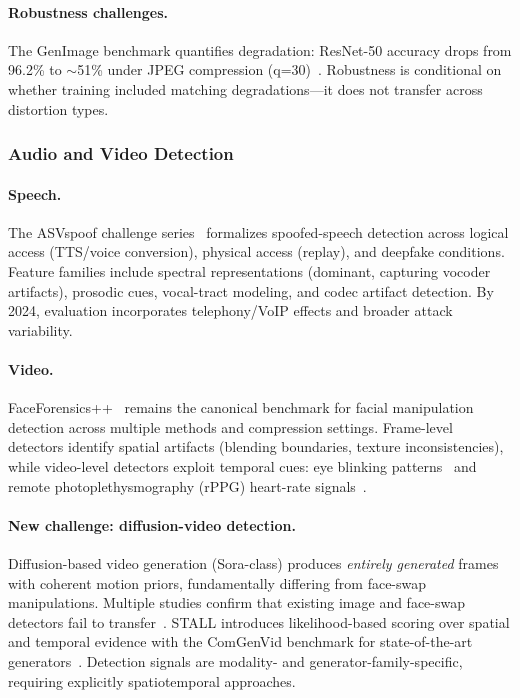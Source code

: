 \paragraph{Robustness challenges.}
The GenImage benchmark quantifies degradation: ResNet-50 accuracy drops from 96.2\% to $\sim$51\% under JPEG compression (q=30)~\cite{zhu2023genimage}. Robustness is conditional on whether training included matching degradations---it does not transfer across distortion types.


\subsubsection{Audio and Video Detection}
\label{sec:detect-av}

\paragraph{Speech.}
The ASVspoof challenge series~\cite{asvspoof2019,asvspoof2021} formalizes spoofed-speech detection across logical access (TTS/voice conversion), physical access (replay), and deepfake conditions. Feature families include spectral representations (dominant, capturing vocoder artifacts), prosodic cues, vocal-tract modeling, and codec artifact detection. By 2024, evaluation incorporates telephony/VoIP effects and broader attack variability.

\paragraph{Video.}
FaceForensics++~\cite{rossler2019faceforensics} remains the canonical benchmark for facial manipulation detection across multiple methods and compression settings. Frame-level detectors identify spatial artifacts (blending boundaries, texture inconsistencies), while video-level detectors exploit temporal cues: eye blinking patterns~\cite{li2018ictuoculi} and remote photoplethysmography (rPPG) heart-rate signals~\cite{hernandez2020rppg}.

\paragraph{New challenge: diffusion-video detection.}
Diffusion-based video generation (Sora-class) produces \emph{entirely generated} frames with coherent motion priors, fundamentally differing from face-swap manipulations. Multiple studies confirm that existing image and face-swap detectors fail to transfer~\cite{cai2024beyonddeepfake}. STALL introduces likelihood-based scoring over spatial and temporal evidence with the ComGenVid benchmark for state-of-the-art generators~\cite{stall2026}. Detection signals are modality- and generator-family-specific, requiring explicitly spatiotemporal approaches.


